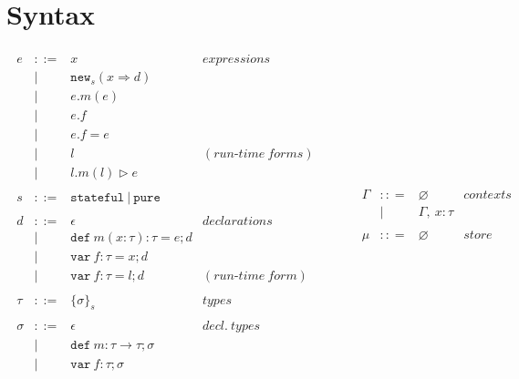 \documentclass{llncs}
\newcommand{\keywadj}[1]{\mathtt{#1}}
\newcommand{\keyw}[1]{\keywadj{#1}~}
\begin{document}
\section{Syntax}

\[
\begin{array}{lll}
\begin{array}{lllr}
e & ::= & x & expressions \\
& | & \keywadj{new}_{s}(x \Rightarrow d) \\
& | & e.m(e)\\
& | & e.f \\
& | & e.f = e \\
& | & l & (run\mbox{-}time~forms)\\
& | & l.m(l) \rhd e \\
&&\\
s & ::= & \keyw{stateful} | ~\keyw{pure} \\
&&\\
d & ::= & \epsilon & declarations \\
  & |   & \keyw{def} m(x:\tau):\tau = e; d \\
  & |   & \keyw{var} f:\tau = x; d \\
  & |   & \keyw{var} f:\tau = l; d & (run\mbox{-}time~form)\\
&&\\
\tau & ::= & \{ \sigma \}_{s} & types \\
&&\\
\sigma & ::= & \epsilon & decl.~ types \\
       & |   & \keyw{def} m:\tau \rightarrow \tau; \sigma \\
       & |   & \keyw{var} f:\tau; \sigma \\
&&\\
\end{array}
& ~~~~~~
&
\begin{array}{lllr}
\Gamma & :: = & \varnothing & contexts\\
& | & \Gamma,~x : \tau\\
&&\\
\mu & :: = & \varnothing & store\\

\end{array}
\end{array}\]
\end{document}
